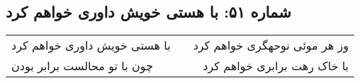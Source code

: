 \begin{center}
\section*{شماره ۵۱: با هستی خویش داوری خواهم کرد}
\label{sec:051}
\begin{longtable}{l p{0.5cm} r}
با هستی خویش داوری خواهم کرد
&&
وز هر موئی نوحهگری خواهم کرد
\\
چون با تو محالست برابر بودن
&&
با خاک رهت برابری خواهم کرد
\\
\end{longtable}
\end{center}
